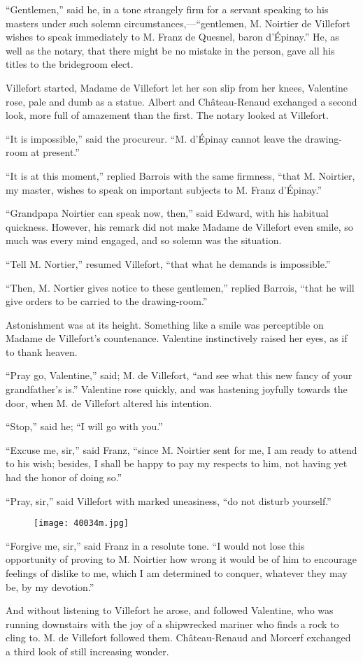 “Gentlemen,” said he, in a tone strangely firm for a servant speaking
to his masters under such solemn circumstances,—“gentlemen, M. Noirtier
de Villefort wishes to speak immediately to M. Franz de Quesnel, baron
d’Épinay.” He, as well as the notary, that there might be no mistake in
the person, gave all his titles to the bridegroom elect.

Villefort started, Madame de Villefort let her son slip from her knees,
Valentine rose, pale and dumb as a statue. Albert and Château-Renaud
exchanged a second look, more full of amazement than the first. The
notary looked at Villefort.

“It is impossible,” said the procureur. “M. d’Épinay cannot leave the
drawing-room at present.”

“It is at this moment,” replied Barrois with the same firmness, “that
M. Noirtier, my master, wishes to speak on important subjects to M.
Franz d’Épinay.”

“Grandpapa Noirtier can speak now, then,” said Edward, with his
habitual quickness. However, his remark did not make Madame de
Villefort even smile, so much was every mind engaged, and so solemn was
the situation.

“Tell M. Nortier,” resumed Villefort, “that what he demands is
impossible.”

“Then, M. Nortier gives notice to these gentlemen,” replied Barrois,
“that he will give orders to be carried to the drawing-room.”

Astonishment was at its height. Something like a smile was perceptible
on Madame de Villefort’s countenance. Valentine instinctively raised
her eyes, as if to thank heaven.

“Pray go, Valentine,” said; M. de Villefort, “and see what this new
fancy of your grandfather’s is.” Valentine rose quickly, and was
hastening joyfully towards the door, when M. de Villefort altered his
intention.

“Stop,” said he; “I will go with you.”

“Excuse me, sir,” said Franz, “since M. Noirtier sent for me, I am
ready to attend to his wish; besides, I shall be happy to pay my
respects to him, not having yet had the honor of doing so.”

“Pray, sir,” said Villefort with marked uneasiness, “do not disturb
yourself.”

\begin{figure}[ht]
\texttt{[image: 40034m.jpg]}
\end{figure}

“Forgive me, sir,” said Franz in a resolute tone. “I would not lose
this opportunity of proving to M. Noirtier how wrong it would be of him
to encourage feelings of dislike to me, which I am determined to
conquer, whatever they may be, by my devotion.”

And without listening to Villefort he arose, and followed Valentine,
who was running downstairs with the joy of a shipwrecked mariner who
finds a rock to cling to. M. de Villefort followed them. Château-Renaud
and Morcerf exchanged a third look of still increasing wonder.
